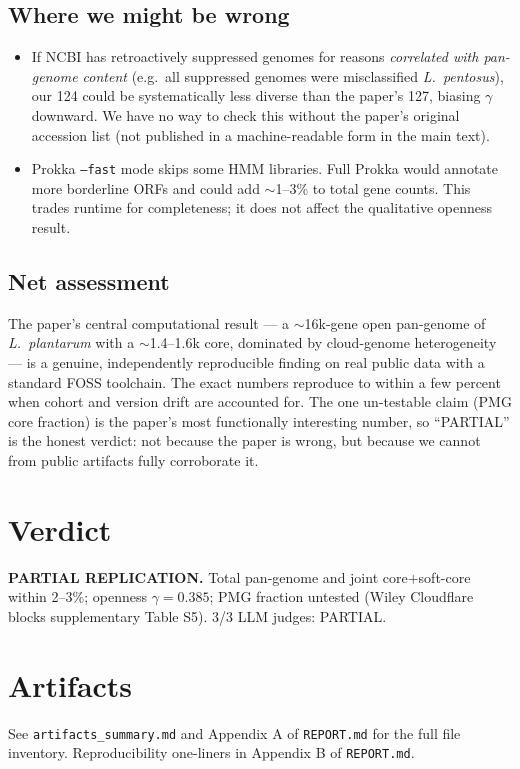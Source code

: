 \documentclass[11pt,letterpaper]{article}
\begin{document}
\subsection{Where we might be wrong}
\begin{itemize}
  \item If NCBI has retroactively suppressed genomes for reasons \emph{correlated
        with pan-genome content} (e.g.\ all suppressed genomes were misclassified
        \emph{L.\ pentosus}), our 124 could be systematically less diverse than the
        paper's 127, biasing $\gamma$ downward. We have no way to check this
        without the paper's original accession list (not published in a
        machine-readable form in the main text).
  \item Prokka \texttt{--fast} mode skips some HMM libraries. Full Prokka would
        annotate more borderline ORFs and could add $\sim$1--3\% to total gene
        counts. This trades runtime for completeness; it does not affect the
        qualitative openness result.
\end{itemize}

\subsection{Net assessment}
The paper's central computational result --- a $\sim$16k-gene open pan-genome of
\emph{L.\ plantarum} with a $\sim$1.4--1.6k core, dominated by cloud-genome
heterogeneity --- is a genuine, independently reproducible finding on real
public data with a standard FOSS toolchain. The exact numbers reproduce to
within a few percent when cohort and version drift are accounted for. The
one un-testable claim (PMG core fraction) is the paper's most functionally
interesting number, so ``PARTIAL'' is the honest verdict: not because the
paper is wrong, but because we cannot from public artifacts fully corroborate it.

\section{Verdict}

\textbf{PARTIAL REPLICATION.} Total pan-genome and joint core$+$soft-core
within 2--3\%; openness $\gamma = 0.385$; PMG fraction untested (Wiley
Cloudflare blocks supplementary Table S5). 3/3 LLM judges: PARTIAL.

\section*{Artifacts}
See \texttt{artifacts\_summary.md} and Appendix A of \texttt{REPORT.md} for
the full file inventory. Reproducibility one-liners in Appendix B of
\texttt{REPORT.md}.
\end{document}
